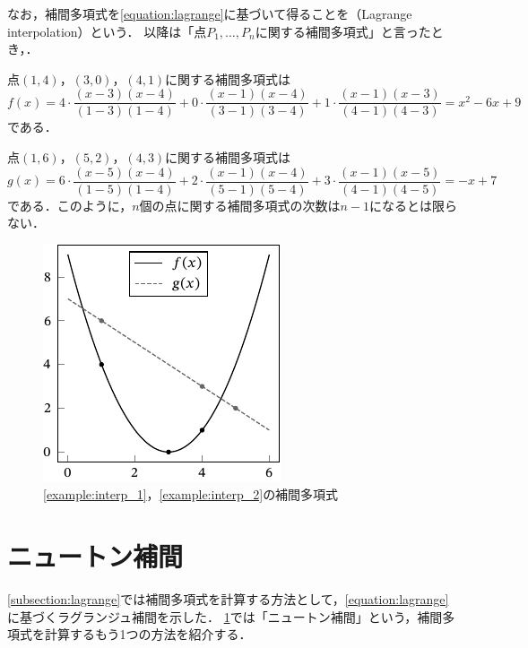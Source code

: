 \documentclass[../../numcalc]{subfiles}
\begin{document}
なお，補間多項式を\cref{equation:lagrange}に基づいて得ることを（Lagrange interpolation）という．
以降は「点\(P_1,\dots,P_n\)に関する補間多項式」と言ったとき，．

\begin{example}
\label{example:interp_1}
点\((1,4)\)，\((3,0)\)，\((4,1)\)に関する補間多項式は
\[
  f(x) = 4\cdot\frac{(x-3)(x-4)}{(1-3)(1-4)}+0\cdot\frac{(x-1)(x-4)}{(3-1)(3-4)}+1\cdot\frac{(x-1)(x-3)}{(4-1)(4-3)}
  = x^2-6x+9
\]
である．
\end{example}

\begin{example}
\label{example:interp_2}
点\((1,6)\)，\((5,2)\)，\((4,3)\)に関する補間多項式は
\[
  g(x) = 6\cdot\frac{(x-5)(x-4)}{(1-5)(1-4)}+2\cdot\frac{(x-1)(x-4)}{(5-1)(5-4)}+3\cdot\frac{(x-1)(x-5)}{(4-1)(4-5)}
  = -x+7
\]
である．このように，\(n\)個の点に関する補間多項式の次数は\(n-1\)になるとは限らない．
\end{example}

\begin{figure}[htbp]
  \centering
  \includegraphics{interpolation.pdf}
  \caption{\cref{example:interp_1}，\cref{example:interp_2}の補間多項式}
\end{figure}

\section{ニュートン補間}
\label{subsection:newton}
\cref{subsection:lagrange}では補間多項式を計算する方法として，\cref{equation:lagrange}に基づくラグランジュ補間を示した．
\cref{subsection:newton}では「ニュートン補間」という，補間多項式を計算するもう1つの方法を紹介する．
\end{document}
